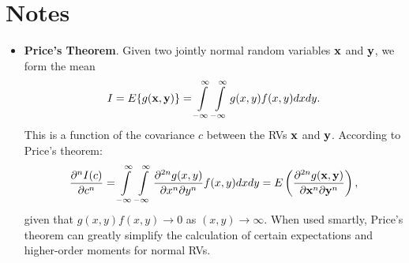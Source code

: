 \documentclass[a4paper, oneside]{book}
\begin{document}
\section{Notes}
\begin{itemize}
\item \textbf{Price's Theorem}. Given two jointly normal random variables $\mathbf x$ and $\mathbf y$, we form the mean %
$$I = E\{g(\mathbf{x,y})\} = \int\limits_{-\infty}^\infty\int\limits_{-\infty}^\infty g(x,y) f(x,y)dx dy.$$ This is a function of the covariance $c$ between the RVs $\mathbf x$ and $\mathbf y$. According to Price's theorem:
$$\frac{\partial ^n I(c)}{\partial c^n} = \int\limits_{-\infty}^\infty \int\limits_{-\infty}^\infty \frac{\partial^{2n} g(x,y)}{\partial x^n \partial y^n} f(x,y) dx dy = E \left( \frac{\partial^{2n} g(\mathbf {x,y})}{\partial \mathbf x^n \partial \mathbf y^n} \right),$$
given that $g(x,y)f(x,y) \to 0$ as $(x,y)\to \infty$. When used smartly, Price's theorem can greatly simplify the calculation of certain expectations and higher-order moments for normal RVs.


\end{itemize}
\end{document}
